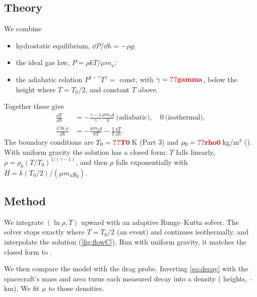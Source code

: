 \documentclass[aps,prd,twocolumn,nofootinbib,floatfix,superscriptaddress]{revtex4-2}
\begin{document}
\subsection{Theory}
We combine
\begin{itemize}
\item hydrostatic equilibrium, $\dd P/\dd h=-\rho g$;
\item the ideal gas law, $P=\rho kT/\mu m_u$;
\item the adiabatic relation $P^{1-\gamma}T^\gamma=$ const, with $\gamma=\val{gamma}$, below the height where $T=T_0/2$, and constant $T$ above.
\end{itemize}
Together these give
\begin{align}
  \frac{\dd T}{\dd h}&=-\frac{\gamma-1}{\gamma}\frac{\mu m_ug}{k}\ \text{(adiabatic)},\quad 0\ \text{(isothermal)},\\
  \frac{\dd\ln\rho}{\dd h}&=-\frac{\mu m_ug}{kT}-\frac{1}{T}\frac{\dd T}{\dd h}.
\end{align}
The boundary conditions are $T_0=\val{T0}$\,K (Part 3) and $\rho_0=\val{rho0}$\,kg/m$^3$ ().
With uniform gravity the solution has a closed form: $T$ falls linearly, $\rho=\rho_0(T/T_0)^{1/(\gamma-1)}$, and then $\rho$ falls exponentially with $H=k(T_0/2)/(\mu m_ug_0)$.

\subsection{Method}
We integrate $(\ln\rho,T)$ upward with an adaptive Runge--Kutta solver.
The solver stops exactly where $T=T_0/2$ (an event) and continues isothermally.
 and  interpolate the solution (\cref{fig:flowC}).
Run with uniform gravity, it matches the closed form to .

We then compare the model with the drag probe.
Inverting \cref{eq:decay} with the spacecraft's mass and area turns each measured decay into a density ( heights, --\,km).
We fit $\mu$ to those densities.
\end{document}
